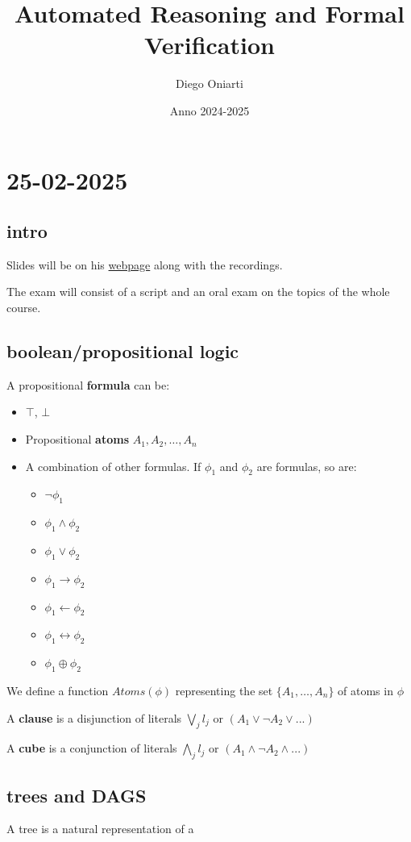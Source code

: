 \documentclass{article}
\title{Automated Reasoning and Formal Verification}
\author{Diego Oniarti}
\date{Anno 2024-2025}
\begin{document}
\maketitle
\tableofcontents

\section{25-02-2025}
\subsection*{intro}
Slides will be on his \href{https://disi.unitn.it/rseba/DIDATTICA/arfv2025/}{webpage} along with the recordings.

The exam will consist of a script and an oral exam on the topics of the whole course.

\subsection*{boolean/propositional logic}
A propositional \textbf{formula} can be:
\begin{itemize}
    \item $\top$, $\bot$
    \item Propositional \textbf{atoms} $A_1, A_2, \dots, A_n$
    \item A combination of other formulas. If $\phi_1$ and $\phi_2$ are formulas, so are:
        \begin{itemize}
            \item $\neg \phi_1$
            \item $\phi_1\wedge\phi_2$
            \item $\phi_1\vee\phi_2$
            \item $\phi_1\to\phi_2$
            \item $\phi_1\leftarrow\phi_2$
            \item $\phi_1\leftrightarrow\phi_2$
            \item $\phi_1\oplus\phi_2$
        \end{itemize}
\end{itemize}

We define a function $Atoms(\phi)$ representing the set $\{A_1,\dots,A_n\}$ of atoms in $\phi$

A \textbf{clause} is a disjunction of literals $\bigvee_j l_j$ or $(A_1\vee \neg A_2 \vee ...)$

A \textbf{cube} is a conjunction of literals $\bigwedge_j l_j$ or $(A_1\wedge \neg A_2 \wedge ...)$

\subsection*{trees and DAGS}
A tree is a natural representation of a 
\end{document}
